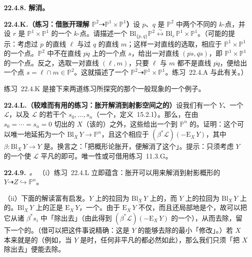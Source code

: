 \textbf{22.4.8. 解消\trRationalMap。}

\textbf{22.4.K.（练习：借胀开理解\trBirational\trRationalMap{} $\mathbb{P}^2\dashrightarrow\mathbb{P}^1\times\mathbb{P}^1$）}\quad 设 $p$、$q$ 是 $\mathbb{P}^2$ 中两个不同的 $k$-点，并设 $r$ 是 $\mathbb{P}^1\times\mathbb{P}^1$ 的一个 $k$-点。请描述一个\trIsomorphism{} $\mathrm{Bl}_{\{p,q\}}\mathbb{P}^2\overset{\sim}{\longleftrightarrow}\mathrm{Bl}_r\,\mathbb{P}^1\times\mathbb{P}^1$。（可能的提示：考虑过 $p$ 的直线 $\ell$ 与过 $q$ 的直线 $m$；这样一对直线的选取，相应于 $\mathbb{P}^1\times\mathbb{P}^1$ 的一个点。$\mathbb{P}^2$ 中不在直线 $\overline{pq}$ 上的一个点 $s$，给出一对直线 $(\overline{ps},\overline{qs})$，即 $\mathbb{P}^1\times\mathbb{P}^1$ 的一个点。反之，选取一对直线 $(\ell,m)$，只要 $\ell$ 与 $m$ 都不是直线 $\overline{pq}$，便给出一个点 $s=\ell\cap m\in\mathbb{P}^2$。这就描述了一个\trBirational\trRationalMap{} $\mathbb{P}^2\dashrightarrow\mathbb{P}^1\times\mathbb{P}^1$。\mbox{练习~22.4.A} 与此有关。）

\mbox{练习~22.4.K} 是接下来两道练习所探究的那个一般现象的一个例子。

\textbf{22.4.L.（较难而有用的练习：胀开解消到射影空间之\trRationalMap{}的\trBaseLocus）}\quad 设我们有一个\trScheme{} $Y$、一个\trInvertibleSheaf{} $\mathscr{L}$，以及 $\mathscr{L}$ 的若干个\trSection{} $s_0,\dots,s_n$（一个\trLinearSystem，\mbox{定义~15.2.1}）。那么，在由 $s_0=\cdots=s_n=0$ 切出的\trClosedSubscheme{} $X$（该\trLinearSystem{}的\trBaseLocus）之外，这些\trSection{}给出一个到 $\mathbb{P}^n$ 的\trMorphism。证明：这个\trMorphism{}可以唯一地延拓为一个\trMorphism{} $\mathrm{Bl}_X\,Y\to\mathbb{P}^n$，且这个\trMorphism{}相应于\trInvertibleSheaf{} $(\beta^*\mathscr{L})(-\mathrm{E}_X\,Y)$，其中 $\beta\colon\mathrm{Bl}_X\,Y\to Y$ 是\trBlowup{}\trMorphism。换言之：「把概形论\trBaseLocus{}胀开，便解消了这个\trRationalMap」。提示：只须考虑 $Y$ 的一个使 $\mathscr{L}$ 平凡的\trAffine\trOpenSubset{}即可。唯一性或可借用\mbox{练习~11.3.G}。

\textbf{22.4.9.}\ \emph{\trhRemark。}\quad
（i）\mbox{练习~22.4.L} 立即蕴含：胀开可以用来解消到射影概形的\trRationalMap{} $Y\dashrightarrow Z\hookrightarrow\mathbb{P}^n$。

（ii）下面的解读富有启发。$Y$ 上的\trLinearSystem{}拉回为 $\mathrm{Bl}_X\,Y$ 上的\trLinearSystem，而 $Y$ 上\trLinearSystem{}的\trBaseLocus{}拉回为 $\mathrm{Bl}_X\,Y$ 上的\trBaseLocus。$\mathrm{Bl}_X\,Y$ 上的\trBaseLocus{}正是 $\mathrm{E}_X\,Y$，一个\trEffectiveCartierDivisor。由于 $\mathrm{E}_X\,Y$ 不仅\trLocallyPrincipal，而且还局部地是个\trNonZerodivisor，故可以把它从诸 $\beta^*s_i$ 中「除出去」（由此得到 $(\beta^*\mathscr{L})(-\mathrm{E}_X\,Y)$ 的一个\trSection），从而去除\trBaseLocus，留下一个\trBasePointFree{}的\trLinearSystem。（借\trUniversalProperty{}可以把这件事说精确：这是 $Y$ 的能够去除\trBaseLocus{}的最小「修改」。）若 $X$ 本来就是\trCartier{}的（例如，当 $Y$ 是\trRegular{}\trPureDimensional{}\trCurve{}时，任何非平凡的\trLinearSystem{}都必然如此），那么我们只须「把 $X$ 除出去」便能去除\trBaseLocus。

